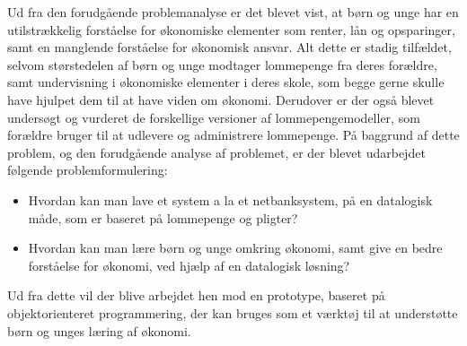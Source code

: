 Ud fra den forudgående problemanalyse er det blevet vist, at børn og unge har en utilstrækkelig forståelse for økonomiske elementer som renter, lån og opsparinger, samt en manglende forståelse for økonomisk ansvar. Alt dette er stadig tilfældet, selvom størstedelen af børn og unge modtager lommepenge fra deres forældre, samt undervisning i økonomiske elementer i deres skole, som begge gerne skulle have hjulpet dem til at have viden om økonomi. Derudover er der også blevet undersøgt og vurderet de forskellige versioner af lommepengemodeller, som forældre bruger til at udlevere og administrere lommepenge. På baggrund af dette problem, og den forudgående analyse af problemet, er der blevet udarbejdet følgende problemformulering:

\begin{itemize}

	\item Hvordan kan man lave et system a la et netbanksystem, på en datalogisk måde, som er baseret på lommepenge og pligter?
	\item Hvordan kan man lære børn og unge omkring økonomi, samt give en bedre forståelse for økonomi, ved hjælp af en datalogisk løsning?

\end{itemize}

Ud fra dette vil der blive arbejdet hen mod en prototype, baseret på objektorienteret programmering, der kan bruges som et værktøj til at understøtte børn og unges læring af økonomi.